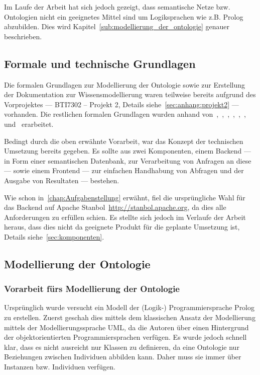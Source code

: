 Im Laufe der Arbeit hat sich jedoch gezeigt, dass semantische Netze bzw. Ontologien nicht ein geeignetes Mittel sind um Logiksprachen wie z.B. Prolog abzubilden. Dies wird Kapitel~\autoref{sub:modellierung_der_ontologie} genauer beschrieben.

\subsection{Formale und technische Grundlagen}
\label{sub:formale_und_technische_grundlagen}
Die formalen Grundlagen zur Modellierung der Ontologie sowie zur Erstellung der Dokumentation zur Wissensmodellierung waren teilweise bereits aufgrund des Vorprojektes --- BTI7302 -- Projekt 2, Details siehe~\autoref{sec:anhang:projekt2} --- vorhanden. Die restlichen formalen Grundlagen wurden anhand von~\cite{IspekOntoBedeutung},~\cite{ISpekOntoGeschichte},~\cite{w3sparql_querylang},~\cite{w3sparql_overview},~\cite{w3rdf_syntax},~\cite{w3rdf},~\cite{w3owl} und~\cite{swrl} erarbeitet.

Bedingt durch die oben erwähnte Vorarbeit, war das Konzept der technischen Umsetzung bereits gegeben. Es sollte aus zwei Komponenten, einem Backend --- in Form einer semantischen Datenbank, zur Verarbeitung von Anfragen an diese --- sowie einem Frontend --- zur einfachen Handhabung von Abfragen und der Ausgabe von Resultaten --- bestehen.

Wie schon in~\autoref{chap:Aufgabenstellung} erwähnt, fiel die ursprüngliche Wahl für das Backend auf Apache Stanbol~\url{http://stanbol.apache.org}, da dies alle Anforderungen zu erfüllen schien. Es stellte sich jedoch im Verlaufe der Arbeit heraus, dass dies nicht da geeignete Produkt für die geplante Umsetzung ist, Details siehe~\autoref{sec:komponenten}.

\subsection{Modellierung der Ontologie}
\label{sub:modellierung_der_ontologie}

\subsubsection{Vorarbeit fürs Modellierung der Ontologie}
\label{sub:modellierung_der_ontologie_vorarbeit}
Ursprünglich wurde versucht ein Modell der (Logik-) Programmiersprache Prolog zu erstellen. Zuerst geschah dies mittels dem klassischen Ansatz der Modellierung mittels der Modellierungssprache UML, da die Autoren über einen Hintergrund der objektorientierten Programmiersprachen verfügen. Es wurde jedoch schnell klar, dass es nicht ausreicht nur Klassen zu definieren, da eine Ontologie nur Beziehungen zwischen Individuen abbilden kann. Daher muss sie immer über Instanzen bzw. Individuen verfügen.

